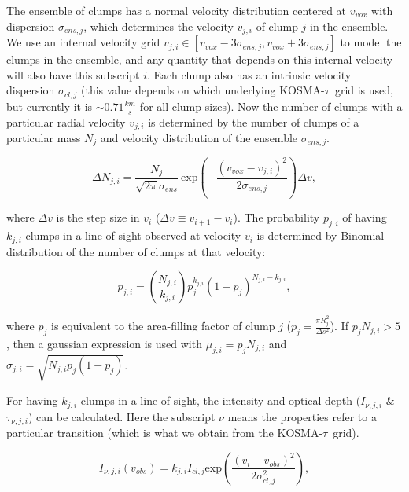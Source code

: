 \documentclass[a4paper]{article}
\newcommand{\kosmatau}{KOSMA-\(\tau\)}
\begin{document}
    The ensemble of clumps has a normal velocity distribution centered at \(v_{vox}\) with dispersion \(\sigma_{ens, j}\), which determines the velocity \(v_{j,i}\) of clump \(j\) in the ensemble.
    We use an internal velocity grid \(v_{j,i} \in [v_{vox} - 3 \sigma_{ens,j}, v_{vox} + 3 \sigma_{ens,j}]\) to model the clumps in the ensemble, and any quantity that depends on this internal velocity will also have this subscript \(i\).
    Each clump also has an intrinsic velocity dispersion \(\sigma_{cl,j}\) (this value depends on which underlying \kosmatau \ grid is used, but currently it is \(\sim0.71 \frac{km}{s}\) for all clump sizes).
    Now the number of clumps with a particular radial velocity \(v_{j,i}\) is determined by the number of clumps of a particular mass \(N_j\) and velocity distribution of the ensemble \(\sigma_{ens,j}\).

    \[
    \Delta N_{j,i} = \frac{N_j}{\sqrt{2 \pi} \sigma_{ens}} \ \mathrm{exp} \left( -\frac{(v_{vox}-v_{j,i})^2}{2 \sigma_{ens, j}} \right) \Delta v,
    \]

    where \(\Delta v\) is the step size in \(v_i\) (\(\Delta v \equiv v_{i+1} - v_i\)).
    The probability \(p_{j,i}\) of having \(k_{j,i}\) clumps in a line-of-sight observed at velocity \(v_i\) is determined by Binomial distribution of the number of clumps at that velocity:

    \[
    p_{j,i} = \binom{N_{j,i}}{k_{j,i}} p_j^{k_{j,i}} (1-p_j)^{N_{j,i}-k_{j,i}},
    \]

    where \(p_j\) is equivalent to the area-filling factor of clump \(j\) (\(p_j = \frac{\pi R_{j}^2}{\Delta s^2}\)).
    If \(p_j N_{j,i}>5\), then a gaussian expression is used with \(\mu_{j,i} = p_j N_{j,i}\) and \(\sigma_{j,i} = \sqrt{N_{j,i} p_j (1-p_j)}\).

    For having \(k_{j,i}\) clumps in a line-of-sight, the intensity and optical depth (\(I_{\nu,j,i}\) \& \(\tau_{\nu,j,i}\)) can be calculated.
    Here the subscript \(\nu\) means the properties refer to a particular transition (which is what we obtain from the \kosmatau \ grid).

    \[
    I_{\nu,j,i} (v_{obs}) = k_{j,i} I_{cl,j} \mathrm{exp} \left( \frac{(v_i-v_{obs})^2}{2\sigma_{cl, j}^2} \right),
    \]
\end{document}
